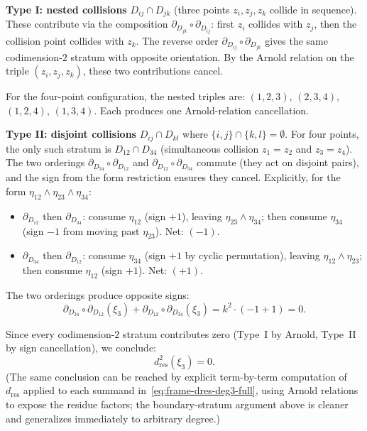 \medskip
\noindent\textbf{Type I: nested collisions} $D_{ij} \cap D_{jk}$
(three points $z_i, z_j, z_k$ collide in sequence).
These contribute via the composition
$\partial_{D_{jk}} \circ \partial_{D_{ij}}$:
first $z_i$ collides with $z_j$, then the collision point
collides with $z_k$. The reverse order
$\partial_{D_{ij}} \circ \partial_{D_{jk}}$ gives the same
codimension-$2$ stratum with opposite orientation. By the
Arnold relation on the triple $(z_i, z_j, z_k)$, these two
contributions cancel.

For the four-point configuration, the nested triples are:
$(1,2,3)$, $(2,3,4)$, $(1,2,4)$, $(1,3,4)$.
Each produces one Arnold-relation cancellation.

\medskip
\noindent\textbf{Type II: disjoint collisions} $D_{ij} \cap D_{kl}$
where $\{i,j\} \cap \{k,l\} = \emptyset$.
For four points, the only such stratum is $D_{12} \cap D_{34}$
(simultaneous collision $z_1 = z_2$ and $z_3 = z_4$). The two
orderings $\partial_{D_{34}} \circ \partial_{D_{12}}$ and
$\partial_{D_{12}} \circ \partial_{D_{34}}$ commute (they act
on disjoint pairs), and the sign from the form restriction
ensures they cancel. Explicitly, for the form
$\eta_{12} \wedge \eta_{23} \wedge \eta_{34}$:
\begin{itemize}
\item $\partial_{D_{12}}$ then $\partial_{D_{34}}$:
 consume $\eta_{12}$ (sign $+1$), leaving
 $\eta_{23} \wedge \eta_{34}$; then consume $\eta_{34}$
 (sign $-1$ from moving past $\eta_{23}$). Net: $(-1)$.
\item $\partial_{D_{34}}$ then $\partial_{D_{12}}$:
 consume $\eta_{34}$ (sign $+1$ by cyclic permutation),
 leaving $\eta_{12} \wedge \eta_{23}$; then consume
 $\eta_{12}$ (sign $+1$). Net: $(+1)$.
\end{itemize}
The two orderings produce opposite signs:
\begin{equation}\label{eq:frame-disjoint-cancel}
\partial_{D_{34}} \circ \partial_{D_{12}}(\xi_3)
+ \partial_{D_{12}} \circ \partial_{D_{34}}(\xi_3)
= k^2 \cdot (-1 + 1) = 0.
\end{equation}

\medskip
Since every codimension-$2$ stratum contributes zero (Type~I
by Arnold, Type~II by sign cancellation), we conclude:
\begin{equation}\label{eq:frame-dsquared-deg3}
\boxed{d_{\mathrm{res}}^2(\xi_3) = 0.}
\end{equation}
(The same conclusion can be reached by explicit term-by-term
computation of $d_{\mathrm{res}}$ applied to each summand
in~\eqref{eq:frame-dres-deg3-full}, using Arnold relations to
expose the residue factors; the boundary-stratum argument above
is cleaner and generalizes immediately to arbitrary degree.)

